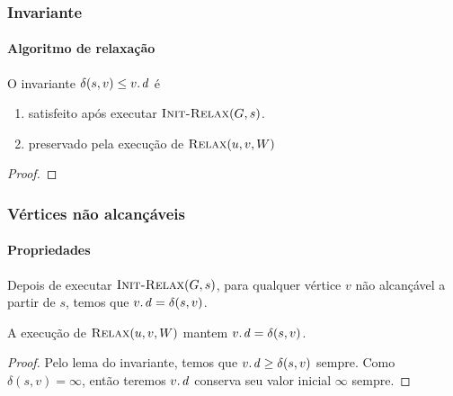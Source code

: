 \documentclass{beamer}
\begin{document}
\begin{frame}
\frametitle{Invariante}
\framesubtitle{Algoritmo de relaxação}

\begin{lemma}[Invariante]
O invariante $\delta(s, v) \le \attrib{v}{d}$ é 
\begin{enumerate}
\item satisfeito após executar $\textnormal{\scshape Init-Relax}(G, s)$.
\item preservado pela execução de $\textnormal{\scshape Relax}(u, v, W)$
\end{enumerate}
\end{lemma}
\pause
\begin{proof}
\end{proof}

\end{frame}

\begin{frame}
\frametitle{Vértices não alcançáveis}
\framesubtitle{Propriedades}

\begin{corollary}
Depois de executar $\textnormal{\scshape Init-Relax}(G,s)$, para qualquer vértice $v$ não alcançável a partir de $s$, temos que $\attrib{v}{d} = \delta(s, v)$.

A execução de $\textnormal{\scshape Relax}(u, v, W)$ mantem $\attrib{v}{d} = \delta(s, v)$.
\end{corollary}

\begin{proof}
Pelo lema do invariante, temos que $\attrib{v}{d} \ge \delta(s, v)$ sempre.
Como $\delta(s, v) = \infty$, então teremos $\attrib{v}{d}$ conserva seu
valor inicial $\infty$ sempre.
\end{proof}
\end{frame}
\end{document}
